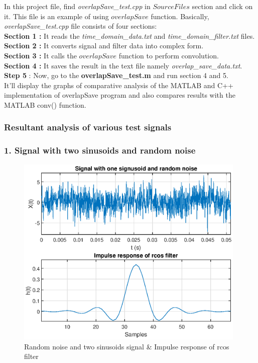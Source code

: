 In this project file, find \textit{overlapSave\_test.cpp} in $Source Files$ section and click on it. This file is an example of using $overlapSave$ function. Basically, \textit{overlapSave\_test.cpp} file consists of four sections:\\
\textbf{ Section 1 :} It reads the \textit{time\_domain\_data.txt} and \textit{ time\_domain\_filter.txt} files.\\
\textbf{ Section 2 :} It converts signal and filter data into complex form. \\
\textbf{ Section 3 :} It calls the $overlapSave$ function to perform convolution.\\
\textbf{ Section 4 :} It saves the result in the text file namely \textit{overlap\_save\_data.txt}.\\

\textbf{Step 5} : Now, go to the \textbf{overlapSave\_test.m} and run section 4 and 5.\\
It'll display the graphs of comparative analysis of the MATLAB and C++ implementation of overlapSave program and also compares results with the MATLAB conv() function.


\subsubsection{Resultant analysis of various test signals}

\subsubsection{1. Signal with two sinusoids and random noise}
\begin{figure}[h]
	\centering
	\includegraphics[width=11cm]{./algorithms/overlap_save/figures/randomNoise.eps}
	\caption{Random noise and two sinusoids signal \& Impulse response of rcos filter}\label{randomNoise}
\end{figure}

